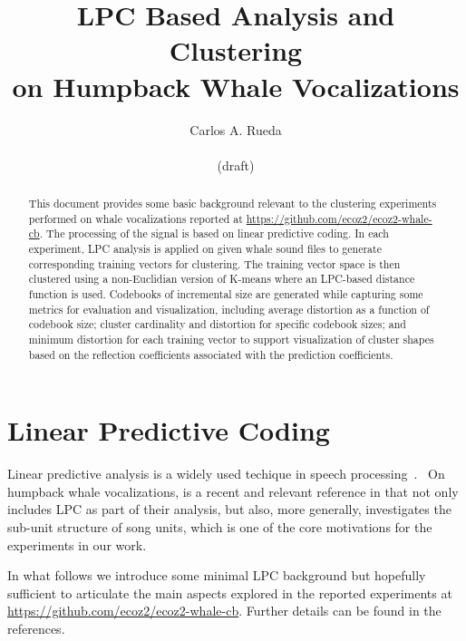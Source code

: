 \documentclass[letterpaper,12pt]{article}
\title{LPC Based Analysis and Clustering\\
 on Humpback Whale Vocalizations}
\author{Carlos A. Rueda\\
\\
(draft)}
\begin{document}
    \maketitle

    \begin{abstract}

        This document provides some basic background relevant to the
        clustering experiments performed on whale vocalizations
        reported at \url{https://github.com/ecoz2/ecoz2-whale-cb}.
        The processing of the signal is based on linear predictive coding.
        In each experiment, LPC analysis is applied on given whale sound files
        to generate corresponding training vectors for clustering.
        The training vector space is then clustered using a non-Euclidian
        version of K-means where an LPC-based distance function is used.
        Codebooks of incremental size are generated while capturing some metrics
        for evaluation and visualization, including average distortion as a
        function of codebook size;
        cluster cardinality and distortion for specific codebook sizes;
        and minimum distortion for each training vector to support visualization
        of cluster shapes based on the reflection coefficients associated
        with the prediction coefficients.

    \end{abstract}

    \section{Linear Predictive Coding}\label{sec:linear-predictive-coding}

    Linear predictive analysis is a widely used techique in speech processing~\citep{Rabiner:Schafer:2007,Parsons:87}.
    \
    On humpback whale vocalizations, \citep{Howard:2018} is a recent and
    relevant reference in that not only includes LPC as part of their analysis,
    but also, more generally, investigates the sub-unit structure of song units,
    which is one of the core motivations for the experiments in our work.

    In what follows we introduce some minimal LPC background but hopefully
    sufficient to articulate the main aspects explored in the reported experiments
    at \url{https://github.com/ecoz2/ecoz2-whale-cb}.
    Further details can be found in the references.
\end{document}

